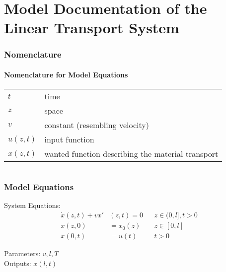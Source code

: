 \documentclass[10pt,a4paper]{article}
\begin{document}
	\part*{Model Documentation of the Linear Transport System} %
	
	
	\section{Nomenclature} %
	\subsection{Nomenclature for Model Equations} %
	
	\begin{tabular}{ll}
		$t$ & time \\
		$z$ & space \\
		$v$ & constant (resembling velocity) \\
		$u(z, t)$ & input function \\
		$x(z, t)$ & wanted function describing the material transport
				
	\end{tabular}
	 
	
	\begin{tabular}{ll}

	\end{tabular}
	
	
	\section{Model Equations} %
	
	\noindent System Equations:			
	\begin{subequations}
	\begin{align*}
		\dot{x}(z,t) + v x'&(z,t) = 0 && z\in (0, l], t>0\\
		x(z,0) &= x_0(z) && z\in [0,l]\\
		x(0,t) &= u(t) && t>0
	\end{align*}
	\end{subequations}

	\noindent
	Parameters: $v, l, T$ %
	\\
	Outputs: $x(l,t)$
	
\end{document}
